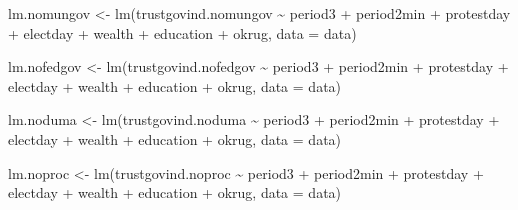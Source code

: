 \documentclass[
  letterpaper,
  DIV=11,
  numbers=noendperiod]{scrartcl}
\newenvironment{Shaded}{\begin{snugshade}}{\end{snugshade}}
\newcommand{\AttributeTok}[1]{\textcolor[rgb]{0.40,0.45,0.13}{#1}}
\newcommand{\FunctionTok}[1]{\textcolor[rgb]{0.28,0.35,0.67}{#1}}
\newcommand{\NormalTok}[1]{\textcolor[rgb]{0.00,0.23,0.31}{#1}}
\newcommand{\OtherTok}[1]{\textcolor[rgb]{0.00,0.23,0.31}{#1}}
\newcommand{\SpecialCharTok}[1]{\textcolor[rgb]{0.37,0.37,0.37}{#1}}
\begin{document}
\begin{Shaded}
\begin{Highlighting}[]
\NormalTok{lm.nomungov }\OtherTok{\textless{}{-}} \FunctionTok{lm}\NormalTok{(trustgovind.nomungov }\SpecialCharTok{\textasciitilde{}}\NormalTok{ period3 }\SpecialCharTok{+}\NormalTok{ period2min }\SpecialCharTok{+}\NormalTok{ protestday }\SpecialCharTok{+}\NormalTok{ electday }\SpecialCharTok{+}
\NormalTok{                  wealth }\SpecialCharTok{+}\NormalTok{ education }\SpecialCharTok{+}\NormalTok{ okrug, }\AttributeTok{data =}\NormalTok{ data) }

\NormalTok{lm.nofedgov }\OtherTok{\textless{}{-}} \FunctionTok{lm}\NormalTok{(trustgovind.nofedgov }\SpecialCharTok{\textasciitilde{}}\NormalTok{ period3 }\SpecialCharTok{+}\NormalTok{ period2min }\SpecialCharTok{+}\NormalTok{ protestday }\SpecialCharTok{+}\NormalTok{ electday }\SpecialCharTok{+}
\NormalTok{                  wealth }\SpecialCharTok{+}\NormalTok{ education }\SpecialCharTok{+}\NormalTok{ okrug, }\AttributeTok{data =}\NormalTok{ data) }

\NormalTok{lm.noduma }\OtherTok{\textless{}{-}} \FunctionTok{lm}\NormalTok{(trustgovind.noduma }\SpecialCharTok{\textasciitilde{}}\NormalTok{ period3 }\SpecialCharTok{+}\NormalTok{ period2min }\SpecialCharTok{+}\NormalTok{ protestday }\SpecialCharTok{+}\NormalTok{ electday }\SpecialCharTok{+}
\NormalTok{                  wealth }\SpecialCharTok{+}\NormalTok{ education }\SpecialCharTok{+}\NormalTok{ okrug, }\AttributeTok{data =}\NormalTok{ data) }

\NormalTok{lm.noproc }\OtherTok{\textless{}{-}} \FunctionTok{lm}\NormalTok{(trustgovind.noproc }\SpecialCharTok{\textasciitilde{}}\NormalTok{ period3 }\SpecialCharTok{+}\NormalTok{ period2min }\SpecialCharTok{+}\NormalTok{ protestday }\SpecialCharTok{+}\NormalTok{ electday }\SpecialCharTok{+}
\NormalTok{                  wealth }\SpecialCharTok{+}\NormalTok{ education }\SpecialCharTok{+}\NormalTok{ okrug, }\AttributeTok{data =}\NormalTok{ data)}


\end{Highlighting}
\end{Shaded}
\end{document}
